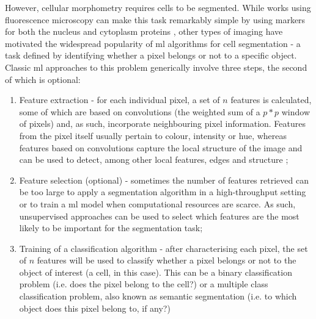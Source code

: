 However, cellular morphometry requires cells to be segmented. While works using fluorescence microscopy can make this task remarkably simple by using markers for both the nucleus and cytoplasm proteins \cite{Fuchs2010-pk,Gustafsdottir2013-ul}, other types of imaging have motivated the widespread popularity of \ac{ml} algorithms for cell segmentation - a task defined by identifying whether a pixel belongs or not to a specific object. Classic \ac{ml} approaches to this problem generically involve three steps, the second of which is optional:

\begin{enumerate}
	\item Feature extraction - for each individual pixel, a set of $n$ features is calculated, some of which are based on convolutions (the weighted sum of a $p*p$ window of pixels) and, as such, incorporate neighbouring pixel information. Features from the pixel itself usually pertain to colour, intensity or hue, whereas features based on convolutions capture the local structure of the image and can be used to detect, among other local features, edges \cite{Canny1986-pi} and structure \cite{Sato1998-sy};
	\item Feature selection (optional) - sometimes the number of features retrieved can be too large to apply a segmentation algorithm in a high-throughput setting or to train a \ac{ml} model when computational resources are scarce. As such, unsupervised approaches can be used to select which features are the most likely to be important for the segmentation task;
	\item Training of a classification algorithm - after characterising each pixel, the set of $n$ features will be used to classify whether a pixel belongs or not to the object of interest (a cell, in this case). This can be a binary classification problem (i.e. does the pixel belong to the cell?) or a multiple class classification problem, also known as semantic segmentation (i.e. to which object does this pixel belong to, if any?)
\end{enumerate}

